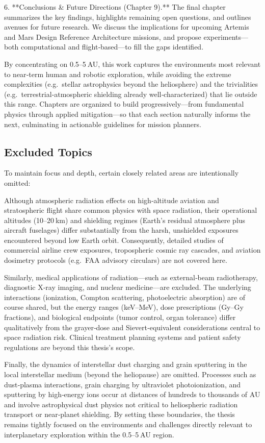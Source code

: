 \documentclass[12pt]{report}
\begin{document}
6. **Conclusions & Future Directions (Chapter 9).**  
   The final chapter summarizes the key findings, highlights remaining open questions, and outlines avenues for future research.  We discuss the implications for upcoming Artemis and Mars Design Reference Architecture missions, and propose experiments—both computational and flight‐based—to fill the gaps identified.

By concentrating on 0.5–5 AU, this work captures the environments most relevant to near‐term human and robotic exploration, while avoiding the extreme complexities (e.g.\ stellar astrophysics beyond the heliosphere) and the trivialities (e.g.\ terrestrial‐atmospheric shielding already well‐characterized) that lie outside this range.  Chapters are organized to build progressively—from fundamental physics through applied mitigation—so that each section naturally informs the next, culminating in actionable guidelines for mission planners.

\subsection{Excluded Topics}

To maintain focus and depth, certain closely related areas are intentionally omitted:

Although atmospheric radiation effects on high‐altitude aviation and stratospheric flight share common physics with space radiation, their operational altitudes (10–20 km) and shielding regimes (Earth’s residual atmosphere plus aircraft fuselages) differ substantially from the harsh, unshielded exposures encountered beyond low Earth orbit.  Consequently, detailed studies of commercial airline crew exposures, tropospheric cosmic ray cascades, and aviation dosimetry protocols (e.g.\ FAA advisory circulars) are not covered here.

Similarly, medical applications of radiation—such as external‐beam radiotherapy, diagnostic X‐ray imaging, and nuclear medicine—are excluded.  The underlying interactions (ionization, Compton scattering, photoelectric absorption) are of course shared, but the energy ranges (keV–MeV), dose prescriptions (Gy–Gy fractions), and biological endpoints (tumor control, organ tolerance) differ qualitatively from the grayer‐dose and Sievert‐equivalent considerations central to space radiation risk.  Clinical treatment planning systems and patient safety regulations are beyond this thesis’s scope.

Finally, the dynamics of interstellar dust charging and grain sputtering in the local interstellar medium (beyond the heliopause) are omitted.  Processes such as dust‐plasma interactions, grain charging by ultraviolet photoionization, and sputtering by high‐energy ions occur at distances of hundreds to thousands of AU and involve astrophysical dust physics not critical to heliospheric radiation transport or near‐planet shielding.  By setting these boundaries, the thesis remains tightly focused on the environments and challenges directly relevant to interplanetary exploration within the 0.5–5 AU region.
\end{document}
